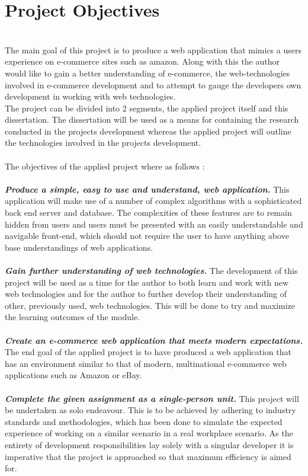 \section{Project Objectives} \\
The main goal of this project is to produce a web application that mimics a users experience on e-commerce sites such as amazon. Along with this the author would like to gain a better understanding of e-commerce, the web-technologies involved in e-commerce development and to attempt to gauge the developers own development in working with web technologies. \\
The project can be divided into 2 segments, the applied project itself and this  dissertation. The dissertation will be used as a means for containing the research conducted in the projects development whereas the applied project will outline the technologies involved in the projects development. \\ \\
The objectives of the applied project where as follows : \\ \\
\textbf{\emph{Produce a simple, easy to use and understand, web application.}} This application will make use of a number of complex algorithms with a sophisticated back end server and database. The complexities of these features are to remain hidden from users and users must be presented with an easily understandable and navigable front-end, which should not require the user to have anything above base understandings of web applications. \\ \\
\textbf{\emph{Gain further understanding of web technologies.}} The development of this project will be used as a time for the author to both learn and work with new web technologies and for the author to further develop their understanding of other, previously used, web technologies. This will be done to try and maximize the learning outcomes of the module. \\ \\
\textbf{\emph{Create an e-commerce web application that meets modern expectations.}} The end goal of the applied project is to have produced a web application that has an environment similar to that of modern, multinational e-commerce web applications such as Amazon or eBay. \\ \\
\textbf{\emph{Complete the given assignment as a single-person unit.}} This project will be undertaken as solo endeavour. This is to be achieved by adhering to industry standards and methodologies, which has been done to simulate the expected experience of working on a similar scenario in a real workplace scenario. As the entirety of development responsibilities lay solely with a singular developer it is imperative that the project is approached so that maximum efficiency is aimed for. \\ \\

